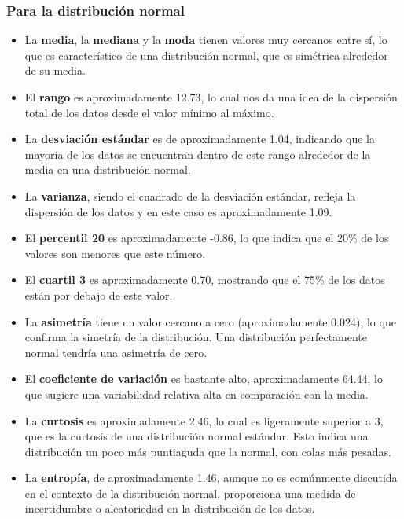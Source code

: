 \documentclass[11pt]{article} %
\begin{document}
	\subsubsection{Para la distribución normal}
	\begin{itemize}
		\item La \textbf{media}, la \textbf{mediana} y la \textbf{moda} tienen valores muy cercanos entre sí, lo que es característico de una distribución normal, que es simétrica alrededor de su media.
		
		\item El \textbf{rango} es aproximadamente 12.73, lo cual nos da una idea de la dispersión total de los datos desde el valor mínimo al máximo.
		
		\item La \textbf{desviación estándar} es de aproximadamente 1.04, indicando que la mayoría de los datos se encuentran dentro de este rango alrededor de la media en una distribución normal.
		
		\item La \textbf{varianza}, siendo el cuadrado de la desviación estándar, refleja la dispersión de los datos y en este caso es aproximadamente 1.09.
		
		\item El \textbf{percentil 20} es aproximadamente -0.86, lo que indica que el 20\% de los valores son menores que este número.
		
		\item El \textbf{cuartil 3} es aproximadamente 0.70, mostrando que el 75\% de los datos están por debajo de este valor.
		
		\item La \textbf{asimetría} tiene un valor cercano a cero (aproximadamente 0.024), lo que confirma la simetría de la distribución. Una distribución perfectamente normal tendría una asimetría de cero.
		
		\item El \textbf{coeficiente de variación} es bastante alto, aproximadamente 64.44, lo que sugiere una variabilidad relativa alta en comparación con la media.
		
		\item La \textbf{curtosis} es aproximadamente 2.46, lo cual es ligeramente superior a 3, que es la curtosis de una distribución normal estándar. Esto indica una distribución un poco más puntiaguda que la normal, con colas más pesadas.
		
		\item La \textbf{entropía}, de aproximadamente 1.46, aunque no es comúnmente discutida en el contexto de la distribución normal, proporciona una medida de incertidumbre o aleatoriedad en la distribución de los datos.
	\end{itemize}
	
\end{document}

